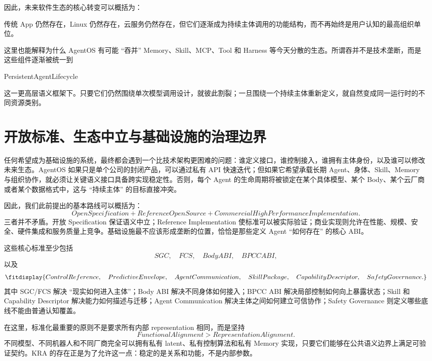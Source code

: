因此，未来软件生态的核心转变可以概括为：
\begin{statementbox}
\centering
{}
\end{statementbox}
传统 App 仍然存在，Linux 仍然存在，云服务仍然存在，但它们逐渐成为持续主体调用的功能结构，而不再始终是用户认知的最高组织单位。

这里也能解释为什么 AgentOS 有可能 ``吞并'' Memory、Skill、MCP、Tool 和 Harness 等今天分散的生态。所谓吞并不是技术垄断，而是这些组件逐渐被统一到
\begin{statementbox}
PersistentAgentLifecycle
\end{statementbox}
这一更高层语义框架下。只要它们仍然围绕单次模型调用设计，就彼此割裂；一旦围绕一个持续主体重新定义，就自然变成同一运行时的不同资源类别。

\section{开放标准、生态中立与基础设施的治理边界}

任何希望成为基础设施的系统，最终都会遇到一个比技术架构更困难的问题：谁定义接口，谁控制接入，谁拥有主体身份，以及谁可以修改未来生态。AgentOS 如果只是单个公司的封闭产品，可以通过私有 API 快速迭代；但如果它希望承载长期 Agent、身体、Skill、Memory 与组织协作，就必须让关键语义接口具备跨实现稳定性。否则，每个 Agent 的生命周期将被锁定在某个具体模型、某个 Body、某个云厂商或者某个数据格式中，这与 ``持续主体'' 的目标直接冲突。

因此，我们此前提出的基本路线可以概括为：
\[
\boxed{
OpenSpecification
+
ReferenceOpenSource
+
CommercialHighPerformanceImplementation.
}
\]
三者并不矛盾。开放 Specification 保证语义中立；Reference Implementation 使标准可以被实际验证；商业实现则允许在性能、规模、安全、硬件集成和服务质量上竞争。基础设施最不应该形成垄断的位置，恰恰是那些定义 Agent ``如何存在'' 的核心 ABI。

这些核心标准至少包括
\[
SGC,\quad
FCS,\quad
BodyABI,\quad
BPCCABI,
\]
以及
\[
\fitdisplay{
ControlReference,\quad
PredictiveEnvelope,\quad
AgentCommunication,\quad
SkillPackage,\quad
CapabilityDescriptor,\quad
SafetyGovernance.
}
\]
其中 SGC/FCS 解决 ``现实如何进入主体''；Body ABI 解决不同身体如何接入；BPCC ABI 解决局部控制如何向上暴露状态；Skill 和 Capability Descriptor 解决能力如何描述与迁移；Agent Communication 解决主体之间如何建立可信协作；Safety Governance 则定义哪些底线不能由普通认知覆盖。

在这里，标准化最重要的原则不是要求所有内部 representation 相同，而是坚持
\[
\boxed{
FunctionalAlignment
>
RepresentationAlignment.
}
\]
不同模型、不同机器人和不同厂商完全可以拥有私有 latent、私有控制算法和私有 Memory 实现，只要它们能够在公共语义边界上满足可验证契约。KRA 的存在正是为了允许这一点：稳定的是关系和功能，不是内部参数。

